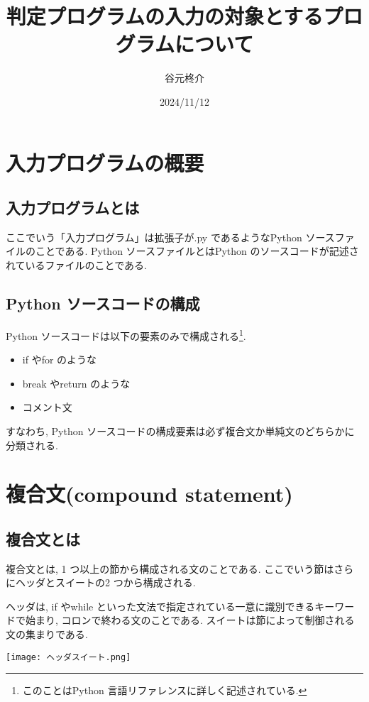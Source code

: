 \documentclass{jlreq}
\title{判定プログラムの入力の対象とするプログラムについて}
\author{谷元柊介}
\date{2024/11/12}
\begin{document}
    \maketitle
    \section{入力プログラムの概要}
        \subsection{入力プログラムとは}
        ここでいう「入力プログラム」は拡張子が.py であるようなPython ソースファイルのことである. Python ソースファイルとはPython のソースコードが記述されているファイルのことである.

        \subsection{Python ソースコードの構成}
        Python ソースコードは以下の要素のみで構成される\footnote{このことはPython 言語リファレンスに詳しく記述されている\cite{目次}.}.
        \begin{itemize}
            \item if やfor のような
            \item break やreturn のような
            \item コメント文
        \end{itemize}
        すなわち, Python ソースコードの構成要素は必ず複合文か単純文のどちらかに分類される.

    \section{複合文(compound statement)}
        \subsection{複合文とは}
            複合文とは, 1 つ以上の節から構成される文のことである\cite{目次}. ここでいう節はさらにヘッダとスイートの2 つから構成される.

            ヘッダは, if やwhile といった文法で指定されている一意に識別できるキーワードで始まり, コロンで終わる文のことである. スイートは節によって制御される文の集まりである\cite{目次}.
            
            \texttt{[image: ヘッダスイート.png]}    
                
\end{document}
